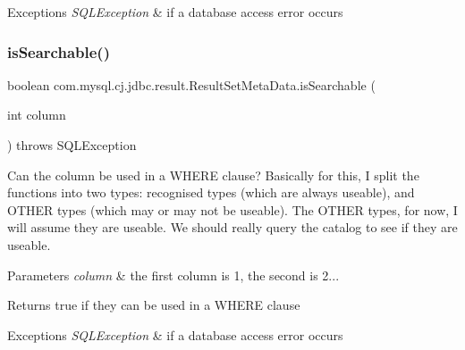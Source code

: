 \begin{DoxyExceptions}{Exceptions}
{\em S\+Q\+L\+Exception} & if a database access error occurs \\
\hline
\end{DoxyExceptions}
\mbox{\label{classcom_1_1mysql_1_1cj_1_1jdbc_1_1result_1_1_result_set_meta_data_a8f2d4be02326a811c85758f8e2d59313}} 
\subsubsection{\texorpdfstring{is\+Searchable()}{isSearchable()}}
{\footnotesize\ttfamily boolean com.\+mysql.\+cj.\+jdbc.\+result.\+Result\+Set\+Meta\+Data.\+is\+Searchable (\begin{DoxyParamCaption}\item[{int}]{column }\end{DoxyParamCaption}) throws S\+Q\+L\+Exception}

Can the column be used in a W\+H\+E\+RE clause? Basically for this, I split the functions into two types\+: recognised types (which are always useable), and O\+T\+H\+ER types (which may or may not be useable). The O\+T\+H\+ER types, for now, I will assume they are useable. We should really query the catalog to see if they are useable.


\begin{DoxyParams}{Parameters}
{\em column} & the first column is 1, the second is 2...\\
\hline
\end{DoxyParams}
\begin{DoxyReturn}{Returns}
true if they can be used in a W\+H\+E\+RE clause
\end{DoxyReturn}

\begin{DoxyExceptions}{Exceptions}
{\em S\+Q\+L\+Exception} & if a database access error occurs \\
\hline
\end{DoxyExceptions}
\mbox{\label{classcom_1_1mysql_1_1cj_1_1jdbc_1_1result_1_1_result_set_meta_data_af85e5d7b7c03147ed4729bbecb488fd0}} 
